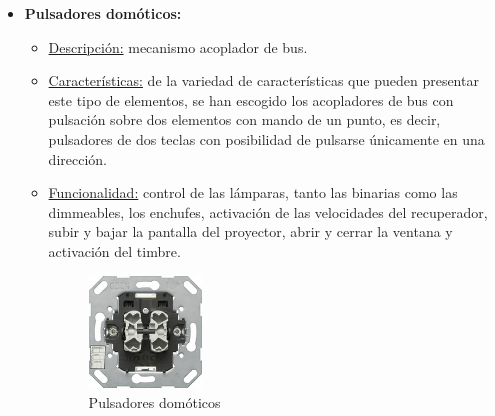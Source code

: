 \begin{itemize}
\item \textbf{Pulsadores domóticos:} 
	\begin{itemize}
	\item\underline{Descripción:} mecanismo acoplador de bus.
	\item \underline{Características:} de la variedad de características que pueden presentar este tipo de elementos, se han escogido los acopladores de bus con pulsación sobre dos elementos con mando de un punto, es decir, pulsadores de dos teclas con posibilidad de pulsarse únicamente en una dirección. 
	\item \underline{Funcionalidad:} control de las lámparas, tanto las binarias como las dimmeables, los enchufes, activación de las velocidades del recuperador, subir y bajar la pantalla del proyector, abrir y cerrar la ventana y activación del timbre.
	\begin{figure}[h]
	\centering
	\includegraphics[width=0.30\textwidth]{figures/pulsador.jpg}   
	\caption{Pulsadores domóticos}
	\label{fig:pulsador}
	\end{figure}
	\end{itemize} 


\end{itemize}
